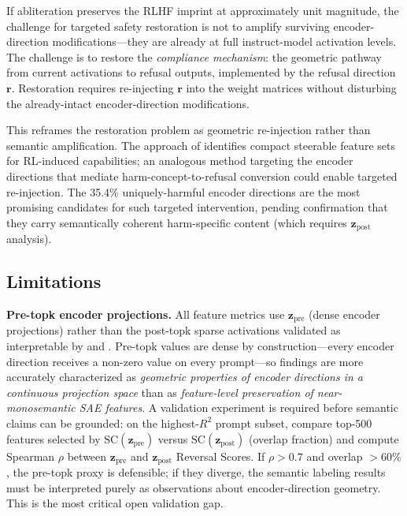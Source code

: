\documentclass[11pt,letterpaper]{article}
\begin{document}
If abliteration preserves the RLHF imprint at approximately unit magnitude, the challenge for
targeted safety restoration is not to amplify surviving encoder-direction modifications---they are
already at full instruct-model activation levels. The challenge is to restore the \emph{compliance
mechanism}: the geometric pathway from current activations to refusal outputs, implemented by the
refusal direction $\mathbf{r}$. Restoration requires re-injecting $\mathbf{r}$ into the weight
matrices without disturbing the already-intact encoder-direction modifications.

This reframes the restoration problem as geometric re-injection rather than semantic amplification.
The approach of \citet{Shportko2026} identifies compact steerable feature sets for RL-induced
capabilities; an analogous method targeting the encoder directions that mediate harm-concept-to-refusal
conversion could enable targeted re-injection. The 35.4\% uniquely-harmful encoder directions are the
most promising candidates for such targeted intervention, pending confirmation that they carry
semantically coherent harm-specific content (which requires $\mathbf{z}_{\text{post}}$ analysis).

\subsection{Limitations}

\textbf{Pre-topk encoder projections.} All feature metrics use $\mathbf{z}_{\text{pre}}$ (dense
encoder projections) rather than the post-topk sparse activations validated as interpretable by
\citet{Bricken2023} and \citet{Templeton2024}. Pre-topk values are dense by construction---every
encoder direction receives a non-zero value on every prompt---so findings are more accurately
characterized as \emph{geometric properties of encoder directions in a continuous projection space}
than as \emph{feature-level preservation of near-monosemantic SAE features}. A validation experiment
is required before semantic claims can be grounded: on the highest-$R^2$ prompt subset, compare
top-500 features selected by $\text{SC}(\mathbf{z}_{\text{pre}})$ versus
$\text{SC}(\mathbf{z}_{\text{post}})$ (overlap fraction) and compute Spearman $\rho$ between
$\mathbf{z}_{\text{pre}}$ and $\mathbf{z}_{\text{post}}$ Reversal Scores. If $\rho > 0.7$ and
overlap $> 60\%$, the pre-topk proxy is defensible; if they diverge, the semantic labeling results
must be interpreted purely as observations about encoder-direction geometry. This is the most critical
open validation gap.
\end{document}
